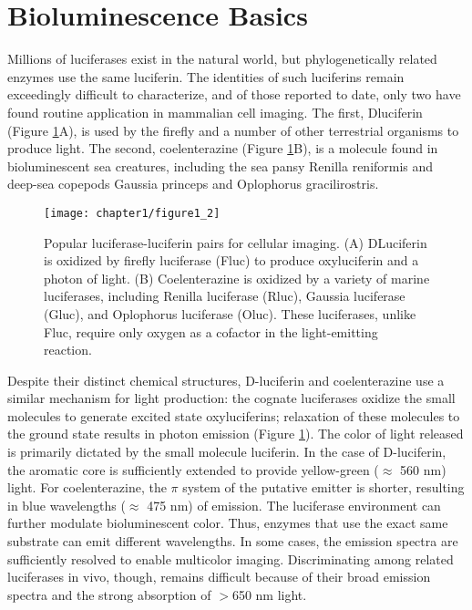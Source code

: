 \section{Bioluminescence Basics}
Millions of luciferases exist in the natural world, but
phylogenetically related enzymes use the same luciferin.\cite{Martini:2017ig} The
identities of such luciferins remain exceedingly difficult to
characterize, and of those reported to date, only two have found
routine application in mammalian cell imaging.\cite{RN26} The first, Dluciferin
(Figure \ref{fig:luc_oxidation}A), is used by the firefly and a number of
other terrestrial organisms to produce light. The second,
coelenterazine (Figure \ref{fig:luc_oxidation}B), is a molecule found in bioluminescent
sea creatures, including the sea pansy Renilla
reniformis and deep-sea copepods Gaussia princeps and
Oplophorus gracilirostris. 

\begin{figure}[htbp]
\texttt{[image: chapter1/figure1\_2]}
\centering
\caption{Popular luciferase-luciferin pairs for cellular imaging. (A) DLuciferin
is oxidized by firefly luciferase (Fluc) to produce oxyluciferin
and a photon of light. (B) Coelenterazine is oxidized by a variety of
marine luciferases, including Renilla luciferase (Rluc), Gaussia
luciferase (Gluc), and Oplophorus luciferase (Oluc). These luciferases,
unlike Fluc, require only oxygen as a cofactor in the light-emitting
reaction.}
  \label{fig:luc_oxidation}
\end{figure}

Despite their distinct chemical
structures, D-luciferin and coelenterazine use a similar
mechanism for light production: the cognate luciferases oxidize
the small molecules to generate excited state oxyluciferins;
relaxation of these molecules to the ground state results in
photon emission (Figure \ref{fig:luc_oxidation}).
The color of light released is primarily dictated by the small
molecule luciferin. In the case of D-luciferin, the aromatic core
is sufficiently extended to provide yellow-green ($\approx$ 560 nm)
light. For coelenterazine, the $\pi$ system of the putative emitter is
shorter, resulting in blue wavelengths ($\approx$ 475 nm) of emission.
The luciferase environment can further modulate bioluminescent
color. Thus, enzymes that use the exact same substrate can
emit different wavelengths. In some cases, the emission spectra
are sufficiently resolved to enable multicolor imaging.\cite{Suzuki:2016jw}
Discriminating among related luciferases in vivo, though,
remains difficult because of their broad emission spectra and
the strong absorption of $>$650 nm light.\cite{Zhao:2005if}
